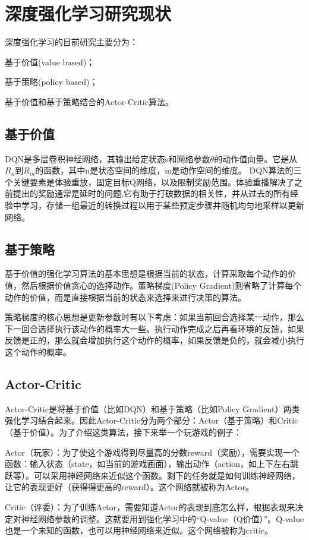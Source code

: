 \section{深度强化学习研究现状}
深度强化学习的目前研究主要分为：
\begin{enumerate*}
  \item 基于价值(value based)；
  \item 基于策略(policy based)；
  \item 基于价值和基于策略结合的Actor-Critic算法。
\end{enumerate*}
\subsection{基于价值}
DQN是多层卷积神经网络，其输出给定状态s和网络参数$\theta$的动作值向量。它是从$R_n$到$R_m$的函数，其中n是状态空间的维度，m是动作空间的维度。 DQN算法的三个关键要素是体验重放，固定目标Q网络，以及限制奖励范围。体验重播解决了之前提出的奖励通常是延时的问题,它有助于打破数据的相关性，并从过去的所有经验中学习，存储一组最近的转换过程以用于某些预定步骤并随机均匀地采样以更新网络。
\subsection{基于策略}
基于价值的强化学习算法的基本思想是根据当前的状态，计算采取每个动作的价值，然后根据价值贪心的选择动作。策略梯度(Policy Gradient)\cite{sutton2000policy}则省略了计算每个动作的价值，而是直接根据当前的状态来选择来进行决策的算法。

策略梯度的核心思想是更新参数时有以下考虑：如果当前回合选择某一动作，那么下一回合选择执行该动作的概率大一些。执行动作完成之后再看环境的反馈，如果反馈是正的，那么就会增加执行这个动作的概率，如果反馈是负的，就会减小执行这个动作的概率。
\subsection{Actor-Critic}
Actor-Critic\cite{Barto1998Reinforcement}是将基于价值（比如DQN）和基于策略（比如Policy Gradient）两类强化学习结合起来。因此Actor-Critic分为两个部分：Actor（基于策略）和Critic（基于价值）。为了介绍这类算法，接下来举一个玩游戏的例子：

Actor（玩家）：为了使这个游戏得到尽量高的分数reward（奖励），需要实现一个函数：输入状态（state，如当前的游戏画面），输出动作（action，如上下左右跳跃等）。可以采用神经网络来近似这个函数。剩下的任务就是如何训练神经网络，让它的表现更好（获得得更高的reward）。这个网络就被称为Actor。

Critic（评委）：为了训练Actor，需要知道Actor的表现到底怎么样，根据表现来决定对神经网络参数的调整。这就要用到强化学习中的“Q-value（Q价值）”。Q-value也是一个未知的函数，也可以用神经网络来近似。这个网络被称为critic。

